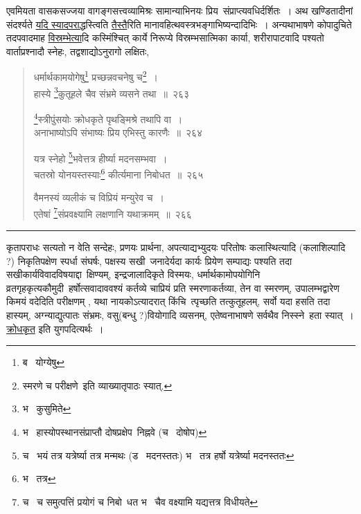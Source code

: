 \documentclass[11pt, openany]{book}
\begin{document}
एवमियता वासकसज्जया वागङ्गसत्त्वव्यामिश्रः सामान्याभिनयः प्रिय\textendash\ संप्राप्त्यवधिर्दर्शितः~। अथ खण्डितादीनां संदर्श्यते \underline{यदि स्यादपराद्ध}स्त्विति \underline{तैस्तै}रिति मानावहित्थवस्त्रभङ्गाभिष्यन्दादिभिः~। अन्यथाभाषणे कोपादुचिते तदपवादमाह \underline{विस्रम्भेत्या}दि कस्मिंश्चित् कार्ये निरूप्ये विस्रम्भसात्मिका कार्या, शरीरापाटवादि पश्यतो वार्ताप्रश्नादौ स्नेहः, तद्वशाद्योऽनुरागो लक्षितः,

\newpage

\begin{quote}
{\na धर्मार्थकामयोगेषु\renewcommand{\thefootnote}{1}\footnote{ब \textendash\  योग्येषु} प्रच्छन्नवचनेषु च\renewcommand{\thefootnote}{*}\footnote{स्मरणे च परीक्षणे\textendash\ इति व्याख्यातृपाठः स्यात्.}~।\\
हास्ये \renewcommand{\thefootnote}{2}\footnote{भ \textendash\  कुसुमिते}कुतूहले चैव संभ्रमे व्यसने तथा~॥~२६३ 

\renewcommand{\thefootnote}{3}\footnote{भ \textendash\  हास्योपस्थानसंप्राप्तौ दोषप्रक्षेप\textendash\ निह्नवे (च \textendash\  दोषोप)}स्त्रीपुंसयोः क्रोधकृते पृथङ्मिश्रे तथापि वा~। \\
अनाभाष्योऽपि संभाष्यः प्रिय एभिस्तु कारणैः~॥~२६४ 

यत्र स्नेहो \renewcommand{\thefootnote}{4}\footnote{च \textendash\  भयं तत्र यत्रेर्ष्या तत्र मन्मथः (ड \textendash\  मदनस्ततः) भ \textendash\  तत्र हर्षो यत्रेर्ष्या मदनस्ततः}भवेत्तत्र हीर्ष्या मदनसम्भवा~।\\
चतस्रो योनयस्तस्याः\renewcommand{\thefootnote}{5}\footnote{भ \textendash\  तत्र} कीर्त्यमाना निबोधत~॥~२६५ 

वैमनस्यं व्यलीकं च विप्रियं मन्युरेव च~।\\
एतेषां \renewcommand{\thefootnote}{6}\footnote{च \textendash\  च समुत्पत्तिं प्रयोगं च निबो\textendash\ धत भ \textendash\  चैव वक्ष्यामि यद्यत्तत्र विधीयते}संप्रवक्ष्यामि लक्षणानि यथाक्रमम्~॥~२६६ }
\end{quote}

\hrule

\vspace{2mm}
\noindent
कृतापराधः सत्यतो न वेति सन्देहः, प्रणयः प्रार्थना, अपत्याद्यभ्युदयः परितोषः कलास्थित्यादि (कलाशिल्पादि ?) निकृतिपक्षेण स्पर्धा संघर्षः, पक्षस्य सखी\textendash\ जनादेर्यदा कार्यः प्रियेण सम्पाद्यः पश्यति तदा सखीकार्यविवादविषयाद्दा\textendash\ क्षिण्यम्, इन्द्रजालादिकृते विस्मयः, धर्मार्थकामोपयोगिनि व्रतगृहकृत्यकौमुदी\textendash\ हर्षोत्सवादाववश्यं कर्तव्ये चाप्रियं प्रति स्मरणाकर्तव्या, तेन वा स्मरणम्, उपालम्भद्वारेण किमयं वदेदिति परीक्षणम् , यथा नायकोऽत्यादरात् किंचि\textendash\ त्पृच्छति तत्कुतूहलम्, सर्वो यदा हसति तदा हास्यम्, अग्न्याद्युत्पातः संभ्रमः, वसु(बन्धु ?)वियोगादि व्यसनम्, एतेष्वनाभाषणे सर्वथैव निस्स्ने\textendash\ हता स्यात्~। \underline{क्रोधकृत} इति युगपदित्यर्थः~। \\
\end{document}
